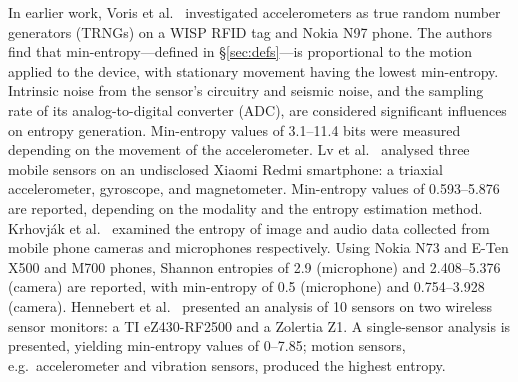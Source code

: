 In earlier work, Voris et al.~\cite{voris2011accelerometers} investigated accelerometers as true random number generators (TRNGs) on a WISP RFID tag and Nokia N97 phone. The authors find that min-entropy---defined in \S\ref{sec:defs}---is proportional to the motion applied to the device, with stationary movement having the lowest min-entropy. Intrinsic noise from the sensor's circuitry and seismic noise, and the sampling rate of its analog-to-digital converter (ADC), are considered significant influences on entropy generation. Min-entropy values of 3.1--11.4 bits were measured depending on the movement of the accelerometer. Lv et al.~\cite{lv2020analysis} analysed three mobile sensors on an undisclosed Xiaomi Redmi smartphone: a triaxial accelerometer, gyroscope, and magnetometer. Min-entropy values of 0.593--5.876 are reported, depending on the modality and the entropy estimation method.  Krhovj\'{a}k et al.~\cite{krhovjak2007sources} examined the entropy of image and audio data collected from mobile phone cameras and microphones respectively. Using Nokia N73 and E-Ten X500
and M700 phones, Shannon entropies of 2.9 (microphone) and 2.408--5.376 (camera) are reported, with min-entropy of 0.5 (microphone) and 0.754--3.928 (camera). Hennebert et al.~\cite{hennebert2013entropy} presented an analysis of  10 sensors on two wireless sensor monitors: a TI eZ430-RF2500 and a Zolertia Z1. A single-sensor analysis is presented, yielding min-entropy values of 0--7.85; motion sensors, e.g.\ accelerometer and vibration sensors, produced the highest entropy.


